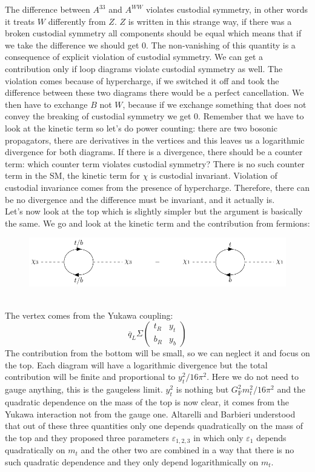 \documentclass[../main.tex]{subfiles}
\begin{document}
The difference between $A^{33}$ and $A^{WW}$ violates custodial symmetry, in other words it treats $W$ differently from $Z$. $Z$ is written in this strange way, if there was a broken custodial symmetry all components should be equal which means that if we take the difference we should get 0. The non-vanishing of this quantity is a consequence of explicit violation of custodial symmetry. We can get a contribution only if loop diagrams violate custodial symmetry as well. The violation comes because of hypercharge, if we switched it off and took the difference between these two diagrams there would be a perfect cancellation. We then have to exchange $B$ not $W$, because if we exchange something that does not convey the breaking of custodial symmetry we get 0. Remember that we have to look at the kinetic term so let's do power counting: there are two bosonic propagators, there are derivatives in the vertices and this leaves us a logarithmic divergence for both diagrams. If there is a divergence, there should be a counter term: which counter term violates custodial symmetry? There is no such counter term in the SM, the kinetic term for $\chi$ is custodial invariant. Violation of custodial invariance comes from the presence of hypercharge. Therefore, there can be no divergence and the difference must be invariant, and it actually is.\\
Let's now look at the top which is slightly simpler but the argument is basically the same. We go and look at the kinetic term and the contribution from fermions:
\begin{figure}[h]
    \centering
    \includegraphics{Images/topbottom.pdf}
    \caption*{}
\end{figure}\\
The vertex comes from the Yukawa coupling:
\[
\overline{q}_L\Sigma\left(\begin{array}{cc}
    t_R & y_t \\
    b_R & y_b
\end{array}\right)
\]
The contribution from the bottom will be small, so we can neglect it and focus on the top. Each diagram will have a logarithmic divergence but the total contribution will be finite and proportional to $y_t^2/16\pi^2$. Here we do not need to gauge anything, this is the gaugeless limit. $y_t^2$ is nothing but $G_{\text{F}}^2m_t^2/16\pi^2$ and the quadratic dependence on the mass of the top is now clear, it comes from the Yukawa interaction not from the gauge one. Altarelli and Barbieri understood that out of these three quantities only one depends quadratically on the mass of the top and they proposed three parameters $\varepsilon_{1,2,3}$ in which only $\varepsilon_1$ depends quadratically on $m_t$ and the other two are combined in a way that there is no such quadratic dependence and they only depend logarithmically on $m_t$.
\end{document}
